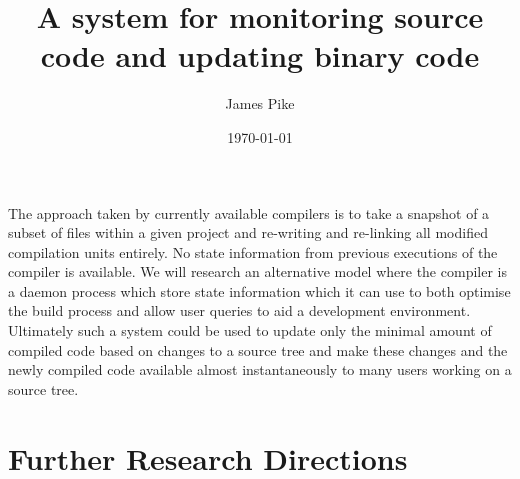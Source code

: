 \documentclass{article}
\begin{document}
\title{A system for monitoring source code and updating binary code}
\author{James Pike}
\date{\today}

\maketitle

The approach taken by currently available compilers is to take a snapshot
of a subset of files within a given project and re-writing and re-linking all
modified compilation units entirely. No state information from previous
executions of the compiler is available. We will research an alternative 
model where the compiler is a daemon process which store state information 
which it can use to both optimise the build process and allow user queries to 
aid a development environment. Ultimately such a system could be used to
update only the minimal amount of compiled code based on changes to a source
tree and make these changes and the newly compiled code available almost 
instantaneously to many users working on a source tree.

\section*{Further Research Directions}




\end{document}

